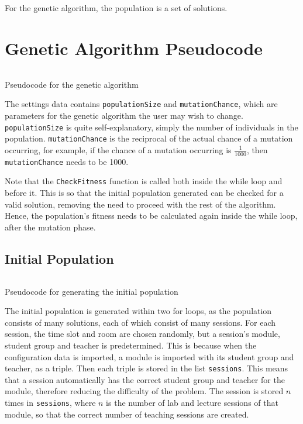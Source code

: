\documentclass[a4paper, 12pt]{report}
\begin{document}
For the genetic algorithm, the population is a set of solutions.

\newpage

\section{Genetic Algorithm Pseudocode}

\begin{listing}[!ht]
	\inputminted[linenos, fontsize=\footnotesize]{text}{code/ga-pseudocode.txt}
	\caption{Pseudocode for the genetic algorithm}
	\label{listing:genetic-algorithm}
\end{listing}

The settings data contains \verb|populationSize| and \verb|mutationChance|, 
which are parameters for the genetic algorithm the user may wish to change.
\verb|populationSize| is quite self-explanatory, simply the number of 
individuals in the population.
\verb|mutationChance| is the reciprocal of the actual chance of a mutation 
occurring, for example, if the chance of a mutation occurring is 
\( \frac{1}{1000} \), then \verb|mutationChance| needs to be 1000.

Note that the \verb|CheckFitness| function is called both inside the while loop
and before it.
This is so that the initial population generated can be checked for a valid 
solution, removing the need to proceed with the rest of the algorithm.
Hence, the population's fitness needs to be calculated again inside the while
loop, after the mutation phase.

\subsection{Initial Population}

\begin{listing}[!ht]
	\inputminted[linenos, fontsize=\footnotesize]{text}{code/population.txt}
	\caption{Pseudocode for generating the initial population}
	\label{listing:population}
\end{listing}

The initial population is generated within two for loops, as the population
consists of many solutions, each of which consist of many sessions.
For each session, the time slot and room are chosen randomly, but a session's 
module, student group and teacher is predetermined.
This is because when the configuration data is imported, a module is imported 
with its student group and teacher, as a triple.
Then each triple is stored in the list \verb|sessions|.
This means that a session automatically has the correct student group and 
teacher for the module, therefore reducing the difficulty of the problem.
The session is stored \( n \) times in \verb|sessions|, where \( n \) is the 
number of lab and lecture sessions of that module, so that the correct number 
of teaching sessions are created.
\end{document}

